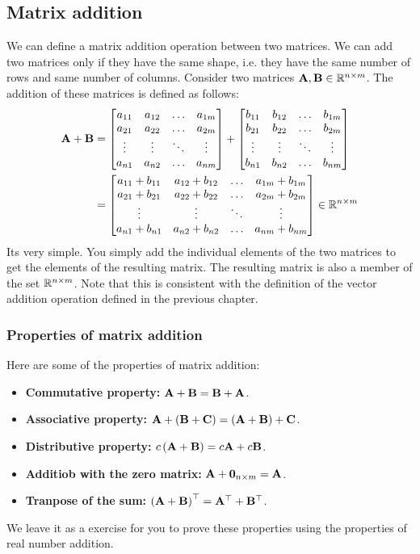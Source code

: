 \subsection{Matrix addition}
We can define a matrix addition operation between two matrices. We can add two matrices only if they have the same shape, i.e. they have the same number of rows and same number of columns. Consider two matrices $\mathbf{A}, \mathbf{B} \in \mathbb{R}^{n \times m}$. The addition of these matrices is defined as follows:
\begin{equation}
    \begin{split}
    \mf{A} + \mf{B} &= \bmxc a_{11} & a_{12} & \ldots & a_{1m} \\ a_{21} & a_{22} & \ldots & a_{2m} \\ \vdots & \vdots & \ddots & \vdots \\ a_{n1} & a_{n2} & \ldots & a_{nm} \emx + \bmxc b_{11} & b_{12} & \ldots & b_{1m} \\ b_{21} & b_{22} & \ldots & b_{2m} \\ \vdots & \vdots & \ddots & \vdots \\ b_{n1} & b_{n2} & \ldots & b_{nm} \emx \\    
    &= \bmxc a_{11} + b_{11} & a_{12} + b_{12} & \ldots & a_{1m} + b_{1m} \\ a_{21} + b_{21} & a_{22} + b_{22} & \ldots & a_{2m} + b_{2m} \\ \vdots & \vdots & \ddots & \vdots \\ a_{n1} + b_{n1} & a_{n2} + b_{n2} & \ldots & a_{nm} + b_{nm} \emx \in \mb{R}^{n \times m}
    \end{split}
    \label{eq:ch02-mat-add}
\end{equation}    
Its very simple. You simply add the individual elements of the two matrices to get the elements of the resulting matrix. The resulting matrix is also a member of the set $\mathbb{R}^{n \times m}$. Note that this is consistent with the definition of the vector addition operation defined in the previous chapter.

\subsubsection{Properties of matrix addition}
Here are some of the properties of matrix addition:
\begin{itemize}
    \item \textbf{Commutative property:} $\mathbf{A} + \mathbf{B} = \mathbf{B} + \mathbf{A}$.
    \item \textbf{Associative property:} $\mathbf{A} + \left( \mathbf{B} + \mathbf{C}\right) = \left( \mathbf{A} + \mathbf{B}\right) + \mathbf{C}$.
    \item \textbf{Distributive property:} $c\left( \mathbf{A} + \mathbf{B}\right) = c\mathbf{A} + c\mathbf{B}$.
    \item \textbf{Additiob with the zero matrix:} $\mathbf{A} + \mathbf{0}_{n \times m} = \mathbf{A}$.
    \item \textbf{Tranpose of the sum:} $\left( \mathbf{A} + \mathbf{B}\right)^\top = \mathbf{A}^\top + \mathbf{B}^\top$.
\end{itemize}    
We leave it as a exercise for you to prove these properties using the properties of real number addition.

